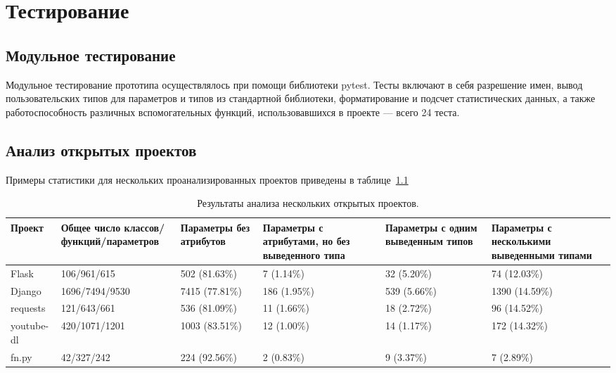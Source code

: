 \chapter{Тестирование}

\section{Модульное тестирование}
\label{sec:unit-testing}

Модульное тестирование прототипа осуществлялось при помощи библиотеки pytest.
Тесты включают в себя разрешение имен, вывод пользовательских типов для
параметров и типов из стандартной библиотеки, форматирование и подсчет
статистических данных, а также работоспособность различных вспомогательных
функций, использовавшихся в проекте --- всего 24 теста. 

\section{Анализ открытых проектов}
\label{sec:projects-analysis}

Примеры статистики для нескольких проанализированных проектов приведены в
таблице~\ref{tab:statistic-results-1}

\begin{table}[H]
  \scriptsize
  \caption{Результаты анализа нескольких открытых проектов.}
  \label{tab:statistic-results-1}
  \begin{tabularx}{\textwidth}{ |X|X|X|X|X|X| }
    \hline
    Проект & Общее число классов/функций/параметров & Параметры без атрибутов &
    Параметры с атрибутами, но без выведенного типа & 
    Параметры с одним выведенным типов & 
    Параметры с несколькими выведенными типами \\
    \hline
    Flask & 106/961/615 & 502 (81.63\%) & 7 (1.14\%) & 32 (5.20\%) & 74 (12.03\%)
    \\ \hline
    Django & 1696/7494/9530 & 7415 (77.81\%) & 186 (1.95\%) & 539 (5.66\%) &
    1390 (14.59\%)
    \\ \hline

    requests & 121/643/661 & 536 (81.09\%) & 11 (1.66\%) & 18 (2.72\%) & 96
    (14.52\%)
    \\ \hline

    youtube-dl & 420/1071/1201 & 1003 (83.51\%) & 12 (1.00\%) & 14 (1.17\%)
    & 172 (14.32\%)
    \\ \hline

    fn.py & 42/327/242 &  224 (92.56\%) & 2 (0.83\%) & 9 (3.37\%) & 7
    (2.89\%)
    \\ \hline

  \end{tabularx}
\end{table}
